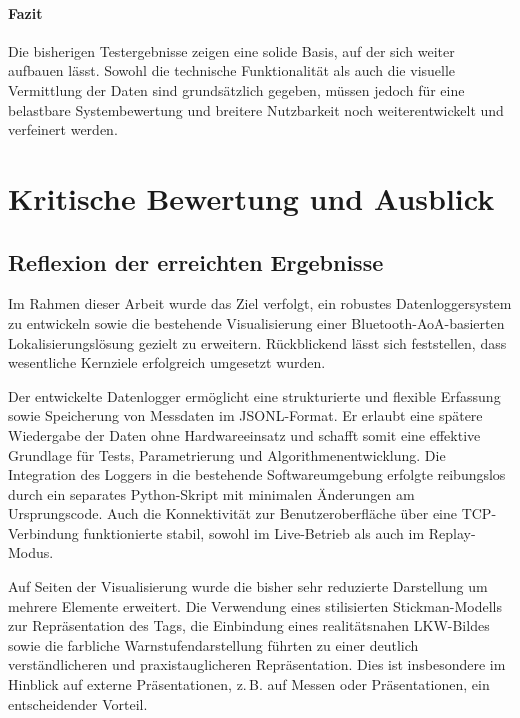 \documentclass[a4paper, 12pt]{article} %
\begin{document}
\paragraph{Fazit}

Die bisherigen Testergebnisse zeigen eine solide Basis, auf der sich weiter aufbauen lässt. Sowohl die technische Funktionalität als auch die visuelle
Vermittlung der Daten sind grundsätzlich gegeben, müssen jedoch für eine belastbare Systembewertung und breitere Nutzbarkeit noch weiterentwickelt und 
verfeinert werden.

\clearpage

\section{Kritische Bewertung und Ausblick}
\subsection{Reflexion der erreichten Ergebnisse}

Im Rahmen dieser Arbeit wurde das Ziel verfolgt, ein robustes Datenloggersystem zu entwickeln sowie die bestehende Visualisierung einer 
Bluetooth-\ac{AoA}-basierten Lokalisierungslösung gezielt zu erweitern. Rückblickend lässt sich feststellen, dass wesentliche Kernziele erfolgreich 
umgesetzt wurden.

Der entwickelte Datenlogger ermöglicht eine strukturierte und flexible Erfassung sowie Speicherung von Messdaten im \ac{JSONL}-Format. Er erlaubt eine 
spätere Wiedergabe der Daten ohne Hardwareeinsatz und schafft somit eine effektive Grundlage für Tests, Parametrierung und Algorithmenentwicklung. 
Die Integration des Loggers in die bestehende Softwareumgebung erfolgte reibungslos durch ein separates Python-Skript mit minimalen Änderungen am 
Ursprungscode. Auch die Konnektivität zur Benutzeroberfläche über eine \ac{TCP}-Verbindung funktionierte stabil, sowohl im Live-Betrieb als auch im 
Replay-Modus.

Auf Seiten der Visualisierung wurde die bisher sehr reduzierte Darstellung um mehrere Elemente erweitert. Die Verwendung eines stilisierten 
Stickman-Modells zur Repräsentation des Tags, die Einbindung eines realitätsnahen \ac{LKW}-Bildes sowie die farbliche Warnstufendarstellung 
führten zu einer deutlich verständlicheren und praxistauglicheren Repräsentation. Dies ist insbesondere im Hinblick auf externe Präsentationen, 
z.\,B. auf Messen oder Präsentationen, ein entscheidender Vorteil.
\end{document}
